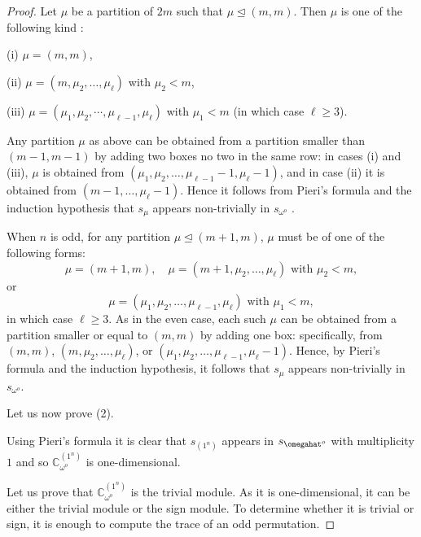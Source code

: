 \begin{proof}
	
	Let $\mu$ be a partition of $2m$ such that $\mu\trianglelefteq (m,m)$. Then $\mu$ is one of the following kind :
	
	(i) $\mu=(m,m)$,
	
	(ii)  $\mu=(m,\mu_2,\dots,\mu_\ell)$ with $\mu_2 <m$,
	
	(iii) $\mu=(\mu_1,\mu_2,\cdots,\mu_{\ell-1},\mu_\ell)$ with $\mu_1<m$ (in which case $\ell\geq 3$).
	
	
	
	Any partition $\mu$ as above can be obtained from a partition smaller than $(m-1,m-1)$ by adding two boxes no two in the same row: in cases (i) and (iii), $\mu$ is obtained  from $(\mu_1,\mu_2,\dots,\mu_{\ell-1}-1,\mu_\ell-1)$, and in case (ii) it is obtained from  $(m-1,\dots,\mu_\ell-1)$. Hence it follows from Pieri's formula and the induction hypothesis that $s_\mu$ appears non-trivially in $s_{\omega^o}$ .
	
	
	
	
	When \(n\) is odd, for any partition \(\mu \trianglelefteq (m+1, m)\), \(\mu\) must be of one of the following forms: 
	\[
	\mu = (m+1, m), \quad \mu = (m+1, \mu_2, \dots, \mu_\ell) \text{ with } \mu_2 < m, \]
	or \[  \mu = (\mu_1, \mu_2, \dots, \mu_{\ell-1}, \mu_\ell) \text{ with } \mu_1 < m,
	\]
	in which case \(\ell \geq 3\). 
	As in the even case, each such \(\mu\) can be obtained from a partition smaller or equal to \((m, m)\) by adding one box: specifically, from \((m, m)\), \((m, \mu_2, \dots, \mu_\ell)\), or \((\mu_1, \mu_2, \dots, \mu_{\ell-1}, \mu_\ell - 1)\). 
	Hence, by Pieri’s formula and the induction hypothesis, it follows that \(s_\mu\) appears non-trivially in \(s_{\omega^o}\).
	
	
	
	
	Let us now prove (2).
	
	
	Using Pieri's formula it is clear that $s_{(1^n)}$ appears in $s_{\omegahat^o}$ with multiplicity $1$ and so 
	$\mathbb{C}_{\omega^o}^{(1^n)}$ is one-dimensional.
	
	
	Let us prove that $\mathbb{C}_{\omega^o}^{(1^n)}$ is the trivial module. As it is one-dimensional, it can be either the trivial module or the sign module. 
	To determine whether it is trivial or sign, it is enough to compute the trace of an odd permutation.
	

\end{proof}
